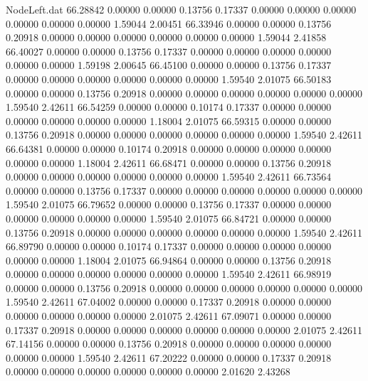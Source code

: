 \begin{filecontents}{NodeLeft.dat}
  66.28842    0.00000    0.00000     0.13756    0.17337    0.00000    0.00000    0.00000    0.00000    0.00000    0.00000    1.59044    2.00451
  66.33946    0.00000    0.00000     0.13756    0.20918    0.00000    0.00000    0.00000    0.00000    0.00000    0.00000    1.59044    2.41858
  66.40027    0.00000    0.00000     0.13756    0.17337    0.00000    0.00000    0.00000    0.00000    0.00000    0.00000    1.59198    2.00645
  66.45100    0.00000    0.00000     0.13756    0.17337    0.00000    0.00000    0.00000    0.00000    0.00000    0.00000    1.59540    2.01075
  66.50183    0.00000    0.00000     0.13756    0.20918    0.00000    0.00000    0.00000    0.00000    0.00000    0.00000    1.59540    2.42611
  66.54259    0.00000    0.00000     0.10174    0.17337    0.00000    0.00000    0.00000    0.00000    0.00000    0.00000    1.18004    2.01075
  66.59315    0.00000    0.00000     0.13756    0.20918    0.00000    0.00000    0.00000    0.00000    0.00000    0.00000    1.59540    2.42611
  66.64381    0.00000    0.00000     0.10174    0.20918    0.00000    0.00000    0.00000    0.00000    0.00000    0.00000    1.18004    2.42611
  66.68471    0.00000    0.00000     0.13756    0.20918    0.00000    0.00000    0.00000    0.00000    0.00000    0.00000    1.59540    2.42611
  66.73564    0.00000    0.00000     0.13756    0.17337    0.00000    0.00000    0.00000    0.00000    0.00000    0.00000    1.59540    2.01075
  66.79652    0.00000    0.00000     0.13756    0.17337    0.00000    0.00000    0.00000    0.00000    0.00000    0.00000    1.59540    2.01075
  66.84721    0.00000    0.00000     0.13756    0.20918    0.00000    0.00000    0.00000    0.00000    0.00000    0.00000    1.59540    2.42611
  66.89790    0.00000    0.00000     0.10174    0.17337    0.00000    0.00000    0.00000    0.00000    0.00000    0.00000    1.18004    2.01075
  66.94864    0.00000    0.00000     0.13756    0.20918    0.00000    0.00000    0.00000    0.00000    0.00000    0.00000    1.59540    2.42611
  66.98919    0.00000    0.00000     0.13756    0.20918    0.00000    0.00000    0.00000    0.00000    0.00000    0.00000    1.59540    2.42611
  67.04002    0.00000    0.00000     0.17337    0.20918    0.00000    0.00000    0.00000    0.00000    0.00000    0.00000    2.01075    2.42611
  67.09071    0.00000    0.00000     0.17337    0.20918    0.00000    0.00000    0.00000    0.00000    0.00000    0.00000    2.01075    2.42611
  67.14156    0.00000    0.00000     0.13756    0.20918    0.00000    0.00000    0.00000    0.00000    0.00000    0.00000    1.59540    2.42611
  67.20222    0.00000    0.00000     0.17337    0.20918    0.00000    0.00000    0.00000    0.00000    0.00000    0.00000    2.01620    2.43268

\end{filecontents}
